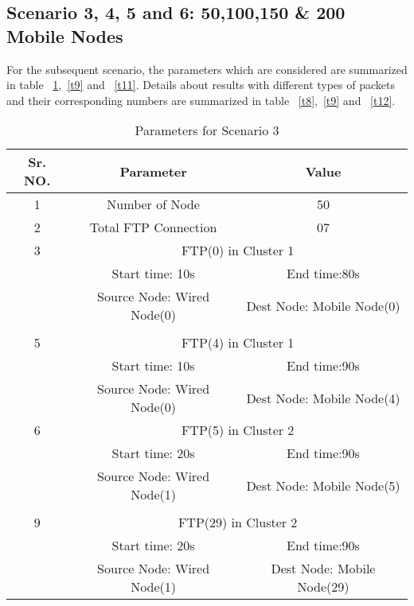\documentclass[3p,times]{elsarticle}
\begin{document}
\subsection{Scenario 3, 4, 5 and 6: 50,100,150 \& 200 Mobile Nodes}
For the subsequent scenario, the parameters which are considered are summarized in table ~\ref{t7},~\ref{t9} and ~\ref{t11}. Details about results with different types of packets and their corresponding numbers are summarized in table  ~\ref{t8},~\ref{t9} and ~\ref{t12}.
\begin{table}[t]
\centering
\caption{Parameters for Scenario 3}
\label{t7}
\begin{tabular}{|c|c|c|}
\hline
Sr. NO. & Parameter & Value \\
\hline
1 & Number of Node & 50 \\
2& Total FTP Connection & 07 \\
\hline
3 & \multicolumn{2}{|c|}{ FTP(0) in Cluster 1} \\
 & Start time: 10s &  End time:80s\\
 & Source Node: Wired Node(0) & Dest Node: Mobile Node(0) \\
\hline
 &  &  \\
\hline
5 & \multicolumn{2}{|c|}{ FTP(4) in Cluster 1} \\
 & Start time: 10s &  End time:90s\\
 & Source Node: Wired Node(0) & Dest Node: Mobile Node(4) \\
\hline
6 & \multicolumn{2}{|c|}{ FTP(5) in Cluster 2} \\
 & Start time: 20s &  End time:90s\\
 & Source Node: Wired Node(1) & Dest Node: Mobile Node(5) \\
\hline
 &  &  \\
\hline
9 & \multicolumn{2}{|c|}{ FTP(29) in Cluster 2} \\
 & Start time: 20s &  End time:90s\\
 & Source Node: Wired Node(1) & Dest Node: Mobile Node(29) \\
\hline
\end{tabular}
\end{table}
\end{document}
